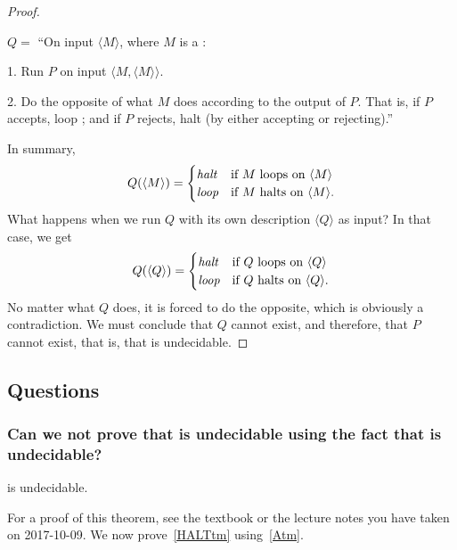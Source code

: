 \begin{proof}
\begin{TMachine}{\(Q =\) ``On input \(\langle M \rangle\), where \(M\) is a \TM{}:}
\item[1.] Run \(P\) on input \(\langle M, \langle M \rangle \rangle\).
\item[2.] Do the opposite of what \(M\) does according to the output of
	\(P\). That is, if \(P\) accepts, loop ; and if \(P\) rejects, halt (by
	either accepting or rejecting).''
\end{TMachine}
In summary,
\begin{displaymath}
	Q(\langle M\rangle) = \begin {cases}
	\emph{halt}&\text{if \(M\) loops on \(\langle M\rangle\)}\\
	\emph{loop}&\text{if \(M\) halts on \(\langle M\rangle\).}
\end{cases}
\end{displaymath}
What happens when we run \(Q\) with its own description \(\langle Q\rangle\) as input? In that
case, we get
\begin{displaymath}
Q(\langle Q\rangle) = \begin {cases}
\emph{halt}&\text{if \(Q\) loops on \(\langle Q\rangle\)}\\
\emph{loop}&\text{if \(Q\) halts on \(\langle Q\rangle\).}
\end{cases}
\end{displaymath}
No matter what \(Q\) does, it is forced to do the opposite, which is obviously a
contradiction. We must conclude that \(Q\) cannot exist, and therefore, that
\(P\) cannot exist, that is, that \HALTtm{} is undecidable.
\end{proof}
\subsection{Questions}
\subsubsection{Can we not prove that \HALTtm{} is undecidable using the fact
that \Atm{} is undecidable?}

\begin{theorem}\label{Atm}
\Atm{} is undecidable.
\end{theorem}

For a proof of this theorem, see the textbook or the lecture notes you have taken
on 2017-10-09. We now prove~\ref{HALTtm} using~\ref{Atm}.

